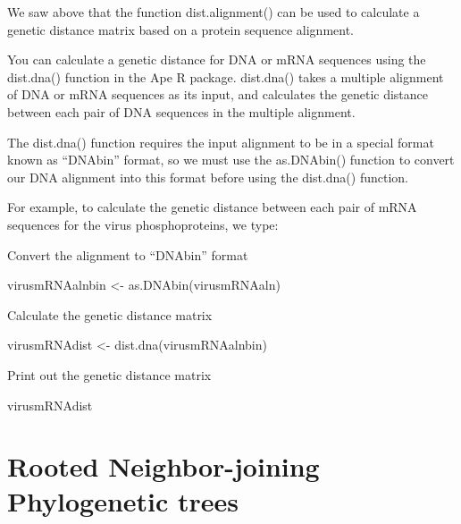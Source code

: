 \documentclass[
]{book}
\newenvironment{Shaded}{\begin{snugshade}}{\end{snugshade}}
\newcommand{\FunctionTok}[1]{\textcolor[rgb]{0.00,0.00,0.00}{#1}}
\newcommand{\NormalTok}[1]{#1}
\newcommand{\OtherTok}[1]{\textcolor[rgb]{0.56,0.35,0.01}{#1}}
\begin{document}
We saw above that the function dist.alignment() can be used to calculate a genetic distance matrix based on a protein sequence alignment.

You can calculate a genetic distance for DNA or mRNA sequences using the dist.dna() function in the Ape R package. dist.dna() takes a multiple alignment of DNA or mRNA sequences as its input, and calculates the genetic distance between each pair of DNA sequences in the multiple alignment.

The dist.dna() function requires the input alignment to be in a special format known as ``DNAbin'' format, so we must use the as.DNAbin() function to convert our DNA alignment into this format before using the dist.dna() function.

For example, to calculate the genetic distance between each pair of mRNA sequences for the virus phosphoproteins, we type:

Convert the alignment to ``DNAbin'' format

\begin{Shaded}
\begin{Highlighting}[]
\NormalTok{virusmRNAalnbin }\OtherTok{\textless{}{-}} \FunctionTok{as.DNAbin}\NormalTok{(virusmRNAaln) }
\end{Highlighting}
\end{Shaded}

Calculate the genetic distance matrix

\begin{Shaded}
\begin{Highlighting}[]
\NormalTok{virusmRNAdist }\OtherTok{\textless{}{-}} \FunctionTok{dist.dna}\NormalTok{(virusmRNAalnbin) }
\end{Highlighting}
\end{Shaded}

Print out the genetic distance matrix

\begin{Shaded}
\begin{Highlighting}[]
\NormalTok{virusmRNAdist                              }
\end{Highlighting}
\end{Shaded}

\hypertarget{rooted-neighbor-joining-phylogenetic-trees}{%
\chapter{Rooted Neighbor-joining Phylogenetic trees}\label{rooted-neighbor-joining-phylogenetic-trees}}
\end{document}
